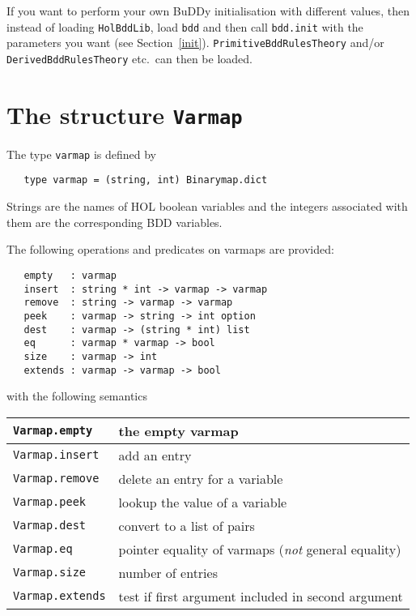 \documentclass[12pt]{article}
\renewcommand{\t}[1]{\mbox{\tt #1}}
\newcommand{\ml}[1]{{\tt #1}}
\newcommand{\Buddy}{BuDDy\xspace}
\begin{document}
If you want to perform your own \Buddy{} initialisation with different
values, then instead of loading \t{HolBddLib}, load \t{bdd} and then
call \t{bdd.init} with the parameters you want (see
Section~\ref{init}).  \t{PrimitiveBddRulesTheory} and/or
\t{DerivedBddRulesTheory} etc.~can  then be loaded.

\section{The structure \ml{Varmap}}\label{Varmap}

The type \t{varmap} is defined by

\vspace*{-2mm}

\begin{verbatim}
   type varmap = (string, int) Binarymap.dict
\end{verbatim}

\vspace*{-2mm}

Strings are the names of HOL boolean variables and the integers associated with them
are the corresponding BDD variables.

\newpage

The following operations and predicates on varmaps are provided:

\begin{verbatim}
   empty   : varmap
   insert  : string * int -> varmap -> varmap
   remove  : string -> varmap -> varmap
   peek    : varmap -> string -> int option
   dest    : varmap -> (string * int) list
   eq      : varmap * varmap -> bool
   size    : varmap -> int
   extends : varmap -> varmap -> bool
\end{verbatim}

with the following semantics

\bigskip

\begin{tabular}{|l|l|} \hline
\t{Varmap.empty} &    the empty varmap \\ \hline
\t{Varmap.insert} &   add an entry \\ \hline
\t{Varmap.remove} &   delete an entry for a variable \\ \hline
\t{Varmap.peek} &     lookup the value of a variable \\ \hline
\t{Varmap.dest} &     convert to a list of pairs \\ \hline
\t{Varmap.eq} &       pointer equality of varmaps ({\it not} general equality) \\ \hline
\t{Varmap.size} &     number of entries \\ \hline
\t{Varmap.extends} &  test if first argument included in second argument\\ \hline
\end{tabular}
\end{document}
